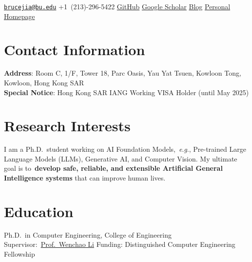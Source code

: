 \documentclass{my_cv}
\newcommand{\eg}{\emph{e}.\emph{g}.}
\begin{document}
\hspace*{\fill}


\hspace*{\fill}

\longcontact
{\href{mailto:~brucejia@bu.edu}{\nolinkurl{brucejia@bu.edu}}}
{+1~(213)-296-5422}
{\href{https://github.com/SuperBruceJia}{GitHub}}
{\href{https://scholar.google.com/citations?user=PfpEP60AAAAJ&hl=en}{Google Scholar}}
{\href{http://shuyuej.com/blog}{Blog}}
{\href{https://shuyuej.com/}{Personal Homepage}}

\hspace*{\fill}

\setlength{\baselineskip}{16pt}

\section{\textbf{Contact Information}}
\noindent\textbf{Address}: Room C, 1/F, Tower 18, Parc Oasis, Yau Yat Tsuen, Kowloon Tong, Kowloon, Hong Kong SAR\\
\noindent\textbf{Special Notice}: Hong Kong SAR IANG Working VISA Holder (until May 2025)

\hspace*{\fill}


\section{\textbf{Research Interests}}

\noindent I am a Ph.D.~student working on AI Foundation Models,~\eg, Pre-trained Large Language Models (LLMs), Generative AI, and Computer Vision. My ultimate goal is to~\textbf{develop safe, reliable, and extensible Artificial General Intelligence systems} that can improve human lives.

\hspace*{\fill}


\section{\textbf{Education}}
\workitemsthree
{Ph.D.~in Computer Engineering, College of Engineering}
{Supervisor:~\href{https://www.bu.edu/eng/profile/39799/}{Prof.~Wenchao Li}}
{Funding: Distinguished Computer Engineering Fellowship}
\end{document}
